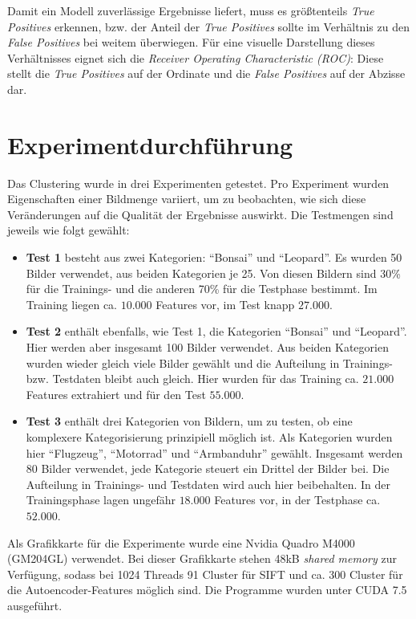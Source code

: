 Damit ein Modell zuverlässige Ergebnisse liefert, muss es größtenteils \textit{True Positives} erkennen, bzw. der Anteil der \textit{True Positives} sollte im Verhältnis zu den \textit{False Positives} bei weitem überwiegen. Für eine visuelle Darstellung dieses Verhältnisses eignet sich die \textit{Receiver Operating Characteristic (ROC)}: Diese stellt die \textit{True Positives} auf der Ordinate und die \textit{False Positives} auf der Abzisse dar.

\section{Experimentdurchführung}

Das Clustering wurde in drei Experimenten getestet. Pro Experiment wurden Eigenschaften einer Bildmenge variiert, um zu beobachten, wie sich diese Veränderungen auf die Qualität der Ergebnisse auswirkt. Die Testmengen sind jeweils wie folgt gewählt:

\begin{itemize}
	\item \textbf{Test 1} besteht aus zwei Kategorien: \enquote{Bonsai} und \enquote{Leopard}. Es wurden 50 Bilder verwendet, aus beiden Kategorien je 25. Von diesen Bildern sind 30\% für die Trainings- und die anderen 70\% für die Testphase bestimmt. Im Training liegen ca. $10.000$ Features vor, im Test knapp $27.000$.
	\item \textbf{Test 2} enthält ebenfalls, wie Test 1, die Kategorien \enquote{Bonsai} und \enquote{Leopard}. Hier werden aber insgesamt 100 Bilder verwendet. Aus beiden Kategorien wurden wieder gleich viele Bilder gewählt und die Aufteilung in Trainings- bzw. Testdaten bleibt auch gleich. Hier wurden für das Training ca. $21.000$ Features extrahiert und für den Test $55.000$.
	\item \textbf{Test 3} enthält drei Kategorien von Bildern, um zu testen, ob eine komplexere Kategorisierung prinzipiell möglich ist. Als Kategorien wurden hier \enquote{Flugzeug}, \enquote{Motorrad} und \enquote{Armbanduhr} gewählt. Insgesamt werden 80 Bilder verwendet, jede Kategorie steuert ein Drittel der Bilder bei. Die Aufteilung in Trainings- und Testdaten wird auch hier beibehalten. In der Trainingsphase lagen ungefähr $18.000$ Features vor, in der Testphase ca. $52.000$.
\end{itemize} 

Als Grafikkarte für die Experimente wurde eine Nvidia Quadro M4000 (GM204GL) verwendet. Bei dieser Grafikkarte stehen 48kB \textit{shared memory} zur Verfügung, sodass bei 1024 Threads 91 Cluster für SIFT und ca. 300 Cluster für die Autoencoder-Features möglich sind. Die Programme wurden unter CUDA 7.5 ausgeführt.\newline

